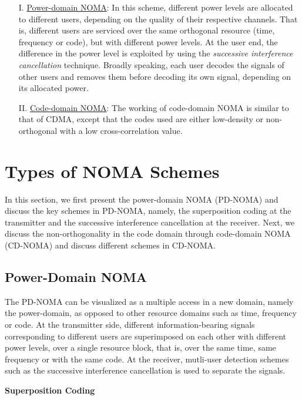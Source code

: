 \begin{multicols}{2}
\begin{enumerate}
 \item[I.] \underline{Power-domain NOMA}: In this scheme, different power levels are allocated to different users, depending on the quality of their respective channels. That is, different users are serviced over the same orthogonal resource (time, frequency or code), but with different power levels. At the user end, the difference in the power level is exploited by using the \emph{successive interference cancellation} technique. Broadly speaking, each user decodes the signals of other users and removes them before decoding its own signal, depending on its allocated power.
 \item[II.] \underline{Code-domain NOMA}: The working of code-domain NOMA is similar to that of CDMA, except that the codes used are either low-density or non-orthogonal with a low cross-correlation value.
\end{enumerate}

\section{Types of NOMA Schemes} \label{SecNOMA_Types}
In this section, we first present the power-domain NOMA (PD-NOMA) and discuss the key schemes in PD-NOMA, namely, the superposition coding at the transmitter and the successive interference cancellation at the receiver. Next, we discuss the non-orthogonality in the code domain through code-domain NOMA (CD-NOMA) and discuss different schemes in CD-NOMA.

\subsection{Power-Domain NOMA} \label{SubSecPDNOMA}
The PD-NOMA can be visualized as a multiple access in a new domain, namely the power-domain, as opposed to other resource domains such as time, frequency or code. At the transmitter side, different information-bearing signals corresponding to different users are superimposed on each other with different power levels, over a single resource block, that is, over the same time, same frequency or with the same code. At the receiver, mutli-user detection schemes such as the successive interference cancellation is used to separate the signals.

\smallskip

\noindent
{\bf Superposition Coding}
\smallskip


\end{multicols}
